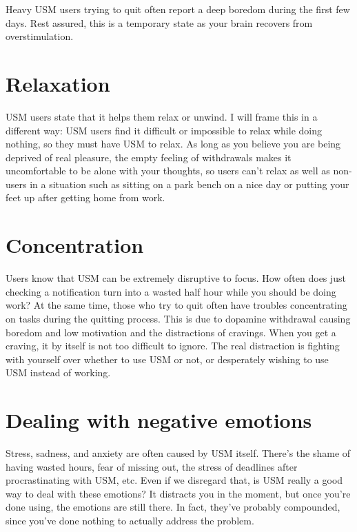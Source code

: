 \documentclass[
  openany]{book}
\begin{document}
Heavy USM users trying to quit often report a deep boredom during the first few days. Rest assured, this is a temporary state as your brain recovers from overstimulation.

\section{Relaxation}\label{relaxation}

USM users state that it helps them relax or unwind. I will frame this in a different way: USM users find it difficult or impossible to relax while doing nothing, so they must have USM to relax. As long as you believe you are being deprived of real pleasure, the empty feeling of withdrawals makes it uncomfortable to be alone with your thoughts, so users can't relax as well as non-users in a situation such as sitting on a park bench on a nice day or putting your feet up after getting home from work.

\section{Concentration}\label{concentration}

Users know that USM can be extremely disruptive to focus. How often does just checking a notification turn into a wasted half hour while you should be doing work? At the same time, those who try to quit often have troubles concentrating on tasks during the quitting process. This is due to dopamine withdrawal causing boredom and low motivation and the distractions of cravings. When you get a craving, it by itself is not too difficult to ignore. The real distraction is fighting with yourself over whether to use USM or not, or desperately wishing to use USM instead of working.

\section{Dealing with negative emotions}\label{dealing-with-negative-emotions}

Stress, sadness, and anxiety are often caused by USM itself. There's the shame of having wasted hours, fear of missing out, the stress of deadlines after procrastinating with USM, etc. Even if we disregard that, is USM really a good way to deal with these emotions? It distracts you in the moment, but once you're done using, the emotions are still there. In fact, they've probably compounded, since you've done nothing to actually address the problem.
\end{document}
